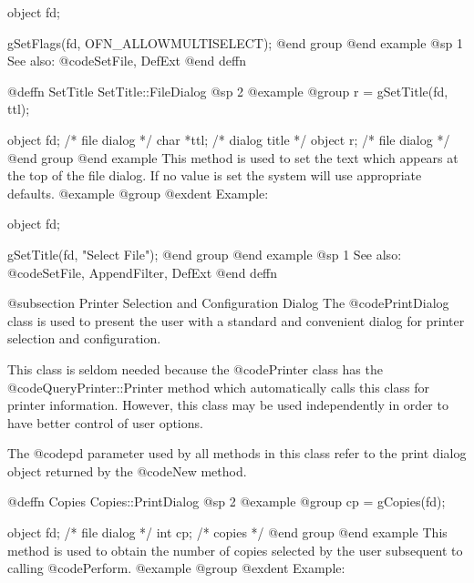 object  fd;

gSetFlags(fd, OFN_ALLOWMULTISELECT);
@end group
@end example
@sp 1
See also:  @code{SetFile, DefExt}
@end deffn















@deffn {SetTitle} SetTitle::FileDialog
@sp 2
@example
@group
r = gSetTitle(fd, ttl);

object  fd;     /*  file dialog  */
char    *ttl;   /*  dialog title */
object  r;      /*  file dialog  */
@end group
@end example
This method is used to set the text which appears at the top of the
file dialog.  If no value is set the system will use appropriate defaults.
@example
@group
@exdent Example:

object  fd;

gSetTitle(fd, "Select File");
@end group
@end example
@sp 1
See also:  @code{SetFile, AppendFilter, DefExt}
@end deffn





@subsection Printer Selection and Configuration Dialog
The @code{PrintDialog} class is used to present the user with a standard
and convenient dialog for printer selection and configuration.

This class is seldom needed because the @code{Printer} class has
the @code{QueryPrinter::Printer} method which automatically calls
this class for printer information.  However, this class may be used
independently in order to have better control of user options.


The @code{pd} parameter used by all methods in this class refer to
the print dialog object returned by the @code{New} method.














@deffn {Copies} Copies::PrintDialog
@sp 2
@example
@group
cp = gCopies(fd);

object  fd;     /*  file dialog  */
int     cp;     /*  copies       */
@end group
@end example
This method is used to obtain the number of copies selected by the user
subsequent to calling @code{Perform}.
@example
@group
@exdent Example:

